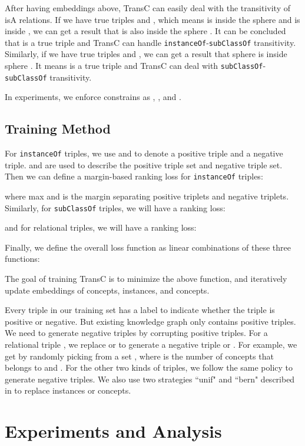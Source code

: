 \documentclass[11pt,a4paper]{article}
\begin{document}
  
  After having embeddings above, TransC can easily deal with the transitivity of isA relations. If we have true triples 
  and , which means  is inside the sphere  and  is inside , we can get a result that
   is also inside the sphere . It can be concluded that  is a true triple and TransC can handle
  \texttt{instanceOf}-\texttt{subClassOf} transitivity. Similarly, if we have true triples  and , we can get a
  result that sphere  is inside sphere . It means  is a true triple and TransC can deal with
  \texttt{subClassOf}-\texttt{subClassOf} transitivity.
  
  In experiments, we enforce constrains as , ,  
  and .
  
  \subsection{Training Method}
  
  For \texttt{instanceOf} triples, we use  and  to denote a
  positive triple and a negative triple.  and  are used to describe the positive triple set and 
  negative triple set. Then we can define a margin-based ranking loss for \texttt{instanceOf} triples:
  
  where  max  and  is the margin separating positive triplets and negative triplets. 
  Similarly, for \texttt{subClassOf} triples, we will have a ranking loss:
  
  and for relational triples, we will have a ranking loss:
  
  Finally, we define the overall loss function as linear combinations of these three functions:
  
  The goal of training TransC is to minimize the
  above function, and iteratively update embeddings of concepts, instances, and concepts.
  
  Every triple in our training set has a label to indicate whether the triple is positive  or
  negative. But existing knowledge graph only contains positive triples. We need to generate negative triples by
  corrupting positive triples. For a relational triple , we replace  or  to generate a negative triple
   or . For example, we get  by randomly picking from a set 
  , where  is the number of concepts that 
  belongs to and .
  For the other two kinds of triples, we follow the same policy to generate negative triples. We also use
  two strategies ``unif" and ``bern" described in \cite{TransH} to replace instances or concepts.
  
  \section{Experiments and Analysis}
  
\end{document}
